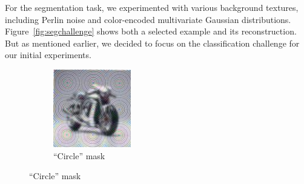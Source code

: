 \documentclass[a4paper, oneside]{discothesis}
\begin{document}
For the segmentation task, we experimented with various background textures, including Perlin noise and color-encoded multivariate Gaussian distributions. Figure~\ref{fig:segchallenge} shows both a selected example and its reconstruction. But as mentioned earlier, we decided to focus on the classification challenge for our initial experiments.

\begin{figure}[th]
	\begin{subfigure}[t]{0.19\textwidth}\centering\includegraphics[width=\linewidth]{figures/hcaptcha-circle.png}\caption{``Circle'' mask}\label{fig:subfig1}\end{subfigure}
	\hfill

\end{figure}
\end{document}
